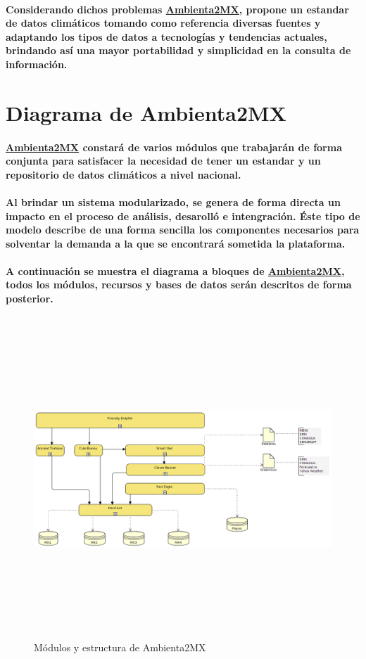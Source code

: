     \paragraph{Considerando dichos problemas \underline{Ambienta2MX}, propone un estandar de datos climáticos tomando como referencia diversas fuentes y adaptando los tipos de datos a tecnologías y tendencias actuales, brindando así una mayor portabilidad y simplicidad en la consulta de información.}
  \newpage
  \section{Diagrama de Ambienta2MX}
    \paragraph{\underline{Ambienta2MX} constará de varios módulos que trabajarán de forma conjunta para satisfacer la necesidad de tener un estandar y un repositorio de datos climáticos a nivel nacional.}
    \paragraph{Al brindar un sistema modularizado, se genera de forma directa un impacto en el proceso de análisis, desarolló e intengración. Éste tipo de modelo describe de una forma sencilla los componentes necesarios para solventar la demanda a la que se encontrará sometida la plataforma.}
    \paragraph{A continuación se muestra el diagrama a bloques de \underline{Ambienta2MX}, todos los módulos, recursos y bases de datos serán descritos de forma posterior.}
  \newpage
  	\begin{landscape}
	  	\begin{figure}[h!]
	  	\centering
		  \includegraphics[width=22.5cm,height=12cm]{./images/DiagramaAmbienta2MX.png}
		  \caption{Módulos y estructura de Ambienta2MX}
		\end{figure}
  	\end{landscape}
  \newpage
